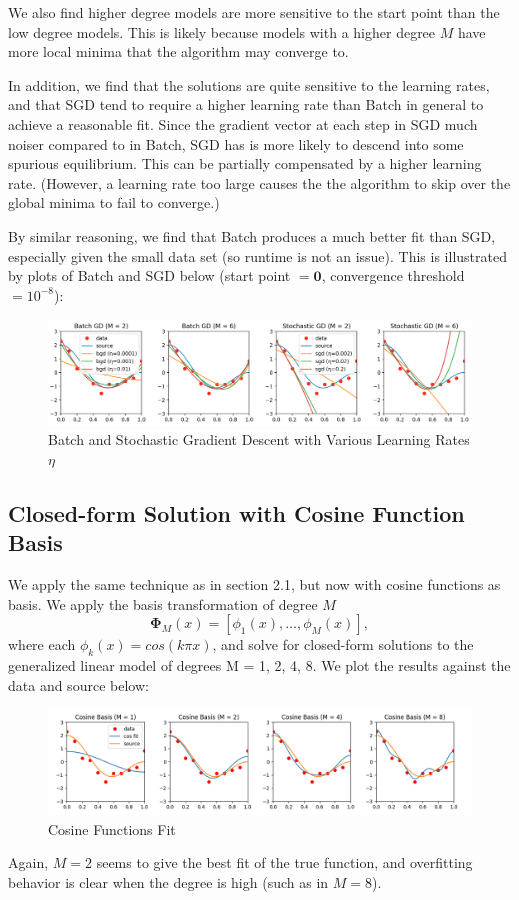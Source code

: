 \documentclass[8pt]{article}
\begin{document}
We also find higher degree models are more sensitive to the start point than the low degree models. This is likely because models with a higher degree $M$ have more local minima that the algorithm may converge to.

In addition, we find that the solutions are quite sensitive to the learning rates, and that SGD tend to require a higher learning rate than Batch in general to achieve a reasonable fit. Since the gradient vector at each step in SGD much noiser compared to in Batch, SGD has is more likely to descend into some spurious equilibrium. This can be partially compensated by a higher learning rate. (However, a learning rate too large causes the the algorithm to skip over the global minima to fail to converge.)


By similar reasoning, we find that Batch produces a much better fit than SGD, especially given the small data set (so runtime is not an issue). This is illustrated by plots of Batch and SGD below (start point $=\bm 0$, convergence threshold $=10^{-8}$):

\begin{figure}[H]
  \centering
  \includegraphics[width = 6.5in]{../P2/figs/part_3.png}
  \caption{Batch and Stochastic Gradient Descent with Various Learning Rates $\eta$}
\end{figure}


\subsection{Closed-form Solution with Cosine Function Basis}

We apply the same technique as in section 2.1, but now with cosine functions as basis. We apply the basis transformation of degree $M$
$$\bm \Phi_M(x) = [\phi_1(x), \dots, \phi_M(x)],$$ where each $\phi_k(x) = cos(k \pi x)$, and solve for closed-form solutions to the generalized linear model of degrees M = 1, 2, 4, 8. We plot the results against the data and source below:
\begin{figure}[H]
  \centering
  \includegraphics[width = 6.5in]{../P2/figs/part_4.png}
  \caption{Cosine Functions Fit}
\end{figure}
Again, $M = 2$ seems to give the best fit of the true function, and overfitting behavior is clear when the degree is high (such as in $M=8$).
\end{document}

